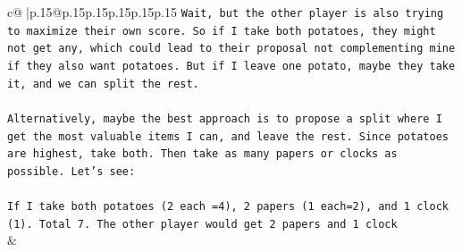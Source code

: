\documentclass{article}
\begin{document}
{\begin{supertabular}{c@{$\;$}|p{.15\linewidth}@{}p{.15\linewidth}p{.15\linewidth}p{.15\linewidth}p{.15\linewidth}p{.15\linewidth}}
{{{\texttt{Wait, but the other player is also trying to maximize their own score. So if I take both potatoes, they might not get any, which could lead to their proposal not complementing mine if they also want potatoes. But if I leave one potato, maybe they take it, and we can split the rest.} \\
\\ 
\texttt{Alternatively, maybe the best approach is to propose a split where I get the most valuable items I can, and leave the rest. Since potatoes are highest, take both. Then take as many papers or clocks as possible. Let's see:} \\
\\ 
\texttt{If I take both potatoes (2 each =4), 2 papers (1 each=2), and 1 clock (1). Total 7. The other player would get 2 papers and 1 clock} \\
            }
        }
    }
    & \\ \\


\end{supertabular}}
\end{document}
